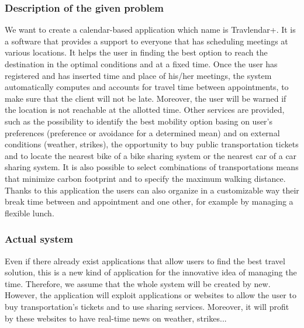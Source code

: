 \documentclass[12pt,titlepage]{article}
\begin{document}
\subsubsection{Description of the given problem}\label{RASD}
We want to create a calendar-based application which name is Travlendar+. It is a software that provides a support to everyone that has scheduling meetings at various locations. It helps the user in finding the best option to reach the destination in the optimal conditions and at a fixed time. 
Once the user has registered and has inserted time and place of his/her meetings, the system automatically computes and accounts for travel time between appointments, to make sure that the client will not be late. Moreover, the user will be warned if the location is not reachable at the allotted time. Other services are provided, such as the possibility to identify the best mobility option basing on user's preferences (preference or avoidance for a determined mean) and on external conditions (weather, strikes), the opportunity to buy public transportation tickets and to locate the nearest bike of a bike sharing system or the nearest car of a car sharing system. It is also possible to select combinations of transportations means that minimize carbon footprint and to specify the maximum walking distance.
Thanks to this application the users can also organize in a customizable way their break time between and appointment and one other, for example by managing a flexible lunch. 

\subsubsection{Actual system}\label{RASD}
Even if there already exist applications that allow users to find the best travel solution, this is a new kind of application for the innovative idea of managing the time. Therefore, we assume that the whole system will be created by new.
However, the application will exploit applications or websites to allow the user to buy transportation's tickets and to use sharing services. Moreover, it will profit by these websites to have real-time news on weather, strikes...
\end{document}
